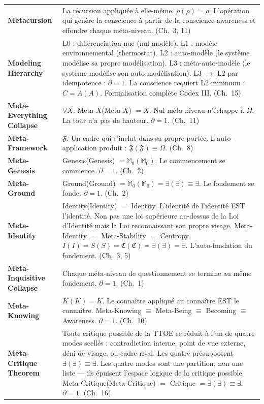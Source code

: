 \documentclass[10pt, openany, oneside]{book}
\renewcommand{\footnotesize}{\fontsize{8.5}{11}\selectfont}
\begin{document}
{\footnotesize
\noindent\begin{tabular}{@{} l @{\hspace{0.6em}} p{} @{}}
\textbf{Metacursion} & La récursion appliquée à elle-même. $\rho(\rho) = \rho$. L'opération qui génère la conscience à partir de la conscience-awareness et effondre chaque méta-niveau. (Ch.\ 3, 11) \\[0.3em]
\textbf{Modeling Hierarchy} & L0 : différenciation nue (nul modèle). L1 : modèle environnemental (thermostat). L2 : auto-modèle (le système modélise sa propre modélisation). L3 : méta-auto-modèle (le système modélise son auto-modélisation). L3 $\to$ L2 par idempotence : $\partial = 1$. La conscience requiert L2 minimum : $C = A(A)$. Formalisation complète Codex III. (Ch.\ 15) \\[0.3em]
\textbf{Meta-Everything Collapse} & $\forall X$: Meta-$X$(Meta-$X$) $= X$. Nul méta-niveau n'échappe à $\Omega$. La tour n'a pas de hauteur. $\partial = 1$. (Ch.\ 11) \\[0.3em]
\textbf{Meta-Framework} & $\mathfrak{F}$. Un cadre qui s'inclut dans sa propre portée. L'auto-application produit : $\mathfrak{F}(\mathfrak{F}) \equiv \Omega$. (Ch.\ 8) \\[0.3em]
\textbf{Meta-Genesis} & Genesis(Genesis) $= \mathbb{M}_0(\mathbb{M}_0)$. Le commencement se commence. $\partial = 1$. (Ch.\ 2) \\[0.3em]
\textbf{Meta-Ground} & Ground(Ground) $= \mathbb{M}_0(\mathbb{M}_0) = \exists(\exists) \equiv \exists$. Le fondement se fonde. $\partial = 1$. (Ch.\ 2) \\[0.3em]
\textbf{Meta-Identity} & Identity(Identity) $=$ Identity. L'identité de l'identité EST l'identité. Non pas une loi supérieure au-dessus de la Loi d'Identité mais la Loi reconnaissant son propre visage. Meta-Identity $=$ Meta-Stability $=$ Centropy. $I(I) = S(S) = \mathfrak{C}(\mathfrak{C}) = \exists(\exists) = \exists$. L'auto-fondation du fondement. (Ch.\ 3, 5) \\[0.3em]
\textbf{Meta-Inquisitive Collapse} & Chaque méta-niveau de questionnement se termine au même fondement. $\partial = 1$. (Ch.\ 1) \\[0.3em]
\textbf{Meta-Knowing} & $K(K) = K$. Le connaître appliqué au connaître EST le connaître. Meta-Knowing $\equiv$ Meta-Being $\equiv$ Becoming $\equiv$ Awareness. $\partial = 1$. (Ch.\ 10) \\[0.3em]
\textbf{Meta-Critique Theorem} & Toute critique possible de la TTOE se réduit à l'un de quatre modes scellés : contradiction interne, point de vue externe, déni de visage, ou cadre rival. Les quatre présupposent $\exists(\exists) \equiv \exists$. Les quatre modes sont une partition, non une liste --- ils épuisent l'espace logique de la critique possible. Meta-Critique(Meta-Critique) $=$ Critique $= \exists(\exists) \equiv \exists$. $\partial = 1$. (Ch.\ 16) \\[0.3em]

\end{tabular}}
\end{document}
